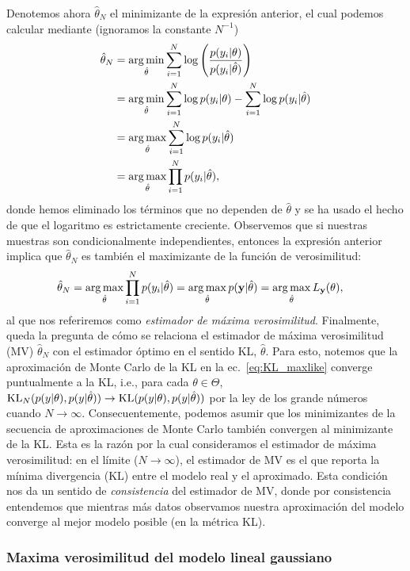\newpage

Denotemos ahora $\hat\theta_N$ el minimizante de la  expresión anterior, el cual podemos calcular mediante (ignoramos la constante $N^{-1}$)
 \begin{align}
 	\hat\theta_N & =  \operatorname*{arg\,min}_{\hat\theta}  \sum_{i=1}^N\log\left(\frac{p(y_i|\theta)}{p(y_i|\hat\theta)}\right)\\
 				&= \operatorname*{arg\,min}_{\hat\theta}  \sum_{i=1}^N  \log p(y_i|\theta) - \sum_{i=1}^N \log p(y_i|\hat\theta)\nonumber\\
 				&= \operatorname*{arg\,max}_{\hat\theta}  \sum_{i=1}^N \log p(y_i|\hat\theta)\nonumber\\
 				&= \operatorname*{arg\,max}_{\hat\theta}  \prod_{i=1}^N p(y_i|\hat\theta),\nonumber
 \end{align}
 donde hemos eliminado los términos que no dependen de $\hat\theta$ y se ha usado el hecho de que el logaritmo es estrictamente creciente. Observemos que si nuestras muestras son condicionalmente independientes, entonces la expresión anterior implica que $\hat\theta_N$ es también el maximizante de la función de verosimilitud:
 \begin{align}
 	\hat\theta_N &= \operatorname*{arg\,max}_{\hat\theta}  \prod_{i=1}^N p(y_i|\hat\theta) = \operatorname*{arg\,max}_{\hat\theta}  p(\mathbf{y}|\hat\theta) = \operatorname*{arg\,max}_{\hat\theta}  L_{\mathbf{y}}(\theta),
 \end{align}
 al que nos  referiremos como \emph{estimador de máxima verosimilitud}. Finalmente, queda la pregunta de cómo se relaciona el estimador de máxima verosimilitud (MV) $\hat\theta_N$ con el estimador óptimo en el sentido KL, $\hat\theta$. Para esto, notemos que la aproximación de Monte Carlo de la KL en la ec.~\eqref{eq:KL_maxlike} converge puntualmente a la KL,  i.e., para cada $\theta\in\Theta$,  $\operatorname{\text{KL}}_N( p(y|\theta),p(y|\hat\theta))\to \operatorname{\text{KL}}( p(y|\theta),p(y|\hat\theta))$ por la ley de los grande números  cuando $N\to\infty$. Consecuentemente, podemos asumir que los minimizantes  de la secuencia de aproximaciones de Monte Carlo también convergen al minimizante de la KL. Esta es la razón por la cual consideramos el estimador de máxima verosimilitud: en el límite ($N\to \infty$), el estimador de MV es el que reporta la mínima divergencia (KL) entre  el modelo real y el aproximado. Esta condición nos da un sentido de \emph{consistencia} del estimador de MV, donde por consistencia entendemos que mientras más datos observamos nuestra aproximación del modelo converge al mejor modelo posible (en la métrica KL).

\subsubsection{Maxima verosimilitud del modelo lineal gaussiano}

